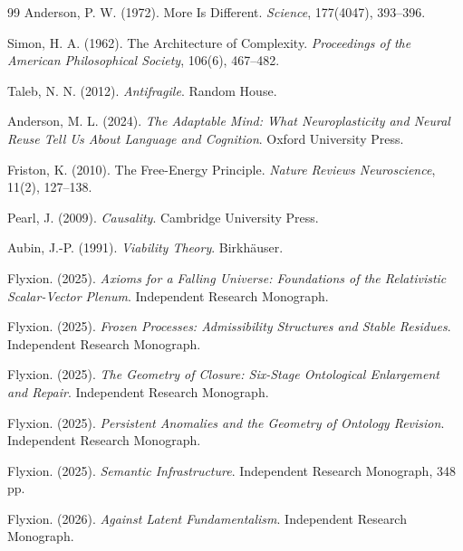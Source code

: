\documentclass[12pt, a4paper]{article}
\theoremstyle{plain}
\theoremstyle{definition}
\theoremstyle{remark}
\begin{document}
\begin{thebibliography}{99}
Anderson, P. W. (1972). More Is Different. \textit{Science}, 177(4047), 393--396.

Simon, H. A. (1962). The Architecture of Complexity. \textit{Proceedings of the American Philosophical Society}, 106(6), 467--482.

Taleb, N. N. (2012). \textit{Antifragile}. Random House.

Anderson, M. L. (2024). \textit{The Adaptable Mind: What Neuroplasticity and Neural Reuse Tell Us About Language and Cognition}. Oxford University Press.

Friston, K. (2010). The Free-Energy Principle. \textit{Nature Reviews Neuroscience}, 11(2), 127--138.

Pearl, J. (2009). \textit{Causality}. Cambridge University Press.

Aubin, J.-P. (1991). \textit{Viability Theory}. Birkh\"{a}user.

Flyxion. (2025). \textit{Axioms for a Falling Universe: Foundations of the Relativistic Scalar-Vector Plenum}. Independent Research Monograph.

Flyxion. (2025). \textit{Frozen Processes: Admissibility Structures and Stable Residues}. Independent Research Monograph.

Flyxion. (2025). \textit{The Geometry of Closure: Six-Stage Ontological Enlargement and Repair}. Independent Research Monograph.

Flyxion. (2025). \textit{Persistent Anomalies and the Geometry of Ontology Revision}. Independent Research Monograph.

Flyxion. (2025). \textit{Semantic Infrastructure}. Independent Research Monograph, 348 pp.

Flyxion. (2026). \textit{Against Latent Fundamentalism}. Independent Research Monograph.

\end{thebibliography}
\end{document}
